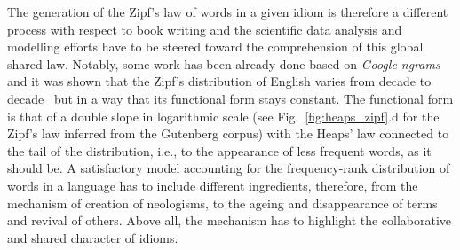 \documentclass[graybox]{svmult}
\begin{document}
The generation of the Zipf's law of words in a given idiom is therefore a different process with respect to book writing and the scientific data analysis and modelling efforts have to be steered toward the comprehension of this global shared law.
Notably, some work has been already done based on \emph{Google ngrams} and it was shown that the Zipf's distribution of English varies from decade to decade~\cite{altmann2013} but in a way that its functional form stays constant.
The functional form is that of a double slope in logarithmic scale (see Fig.~\ref{fig:heaps_zipf}.d for the Zipf's law inferred from the Gutenberg corpus) with the Heaps' law connected to the tail of the distribution, i.e., to the appearance of less frequent words, as it should be. 
A satisfactory model accounting for the frequency-rank distribution of words in a language has to include different ingredients, therefore, from the mechanism of creation of neologisms, to the ageing and disappearance of terms and revival of others.
Above all, the mechanism has to highlight the collaborative and shared character of idioms.

%
%
\end{document}
